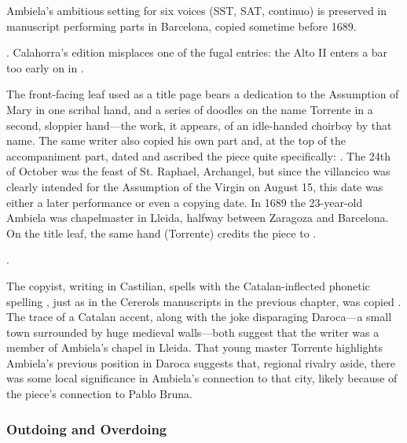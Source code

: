Ambiela's ambitious setting for six voices (SST, SAT, continuo) is preserved in
manuscript performing parts in Barcelona, copied sometime before 1689.%
\begin{Footnote}
    .
    Calahorra's edition misplaces one of the fugal entries: the
    Alto II enters a bar too early on  in
    .
\end{Footnote}
The front-facing leaf used as a title page bears a dedication to the Assumption
of Mary in one scribal hand, and a series of doodles on the name Torrente in a
second, sloppier hand---the work, it appears, of an idle-handed choirboy by
that name.
The same writer also copied his own  part and, at the top of the
accompaniment part, dated and ascribed the piece quite specifically:
.
The 24th of October was the feast of St. Raphael, Archangel, but since the
villancico was clearly intended for the Assumption of the Virgin on August 15,
this date was either a later performance or even a copying date.
In 1689 the 23-year-old Ambiela was chapelmaster in Lleida, halfway between
Zaragoza and Barcelona.  
On the title leaf, the same hand (Torrente) credits the piece to .%
\begin{Footnote}
    .
\end{Footnote}
The copyist, writing in Castilian, spells  with the
Catalan-inflected phonetic spelling ,
just as in the Cererols manuscripts in the previous chapter,
 was copied .  
The trace of a Catalan accent, along with the joke disparaging Daroca---a small
town surrounded by huge medieval walls---both suggest that the writer was a
member of Ambiela's chapel in Lleida.
That young master Torrente highlights Ambiela's previous position in Daroca
suggests that, regional rivalry aside, there was some local significance in
Ambiela's connection to that city, likely because of the piece's connection to
Pablo Bruna.


\subsubsection{Outdoing and Overdoing}

